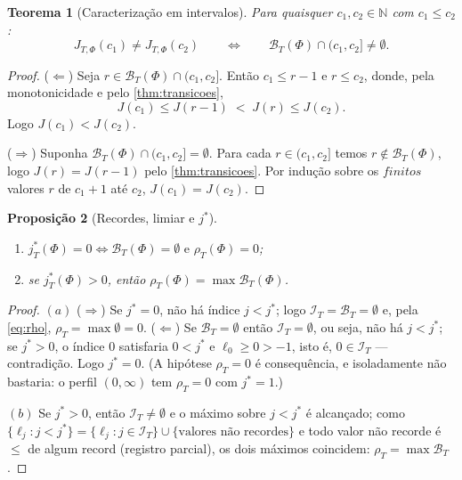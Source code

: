 \documentclass[11pt,a4paper]{article}
\newtheorem{theorem}{Teorema}[section]
\newtheorem{proposition}[theorem]{Proposição}
\theoremstyle{definition}
\theoremstyle{remark}
\newcommand{\N}{\mathbb{N}}
\begin{document}
\begin{theorem}[Caracteriza\c{c}\~{a}o em intervalos]\label{thm:intervalos}
Para quaisquer $c_1, c_2 \in \N$ com $c_1 \leq c_2$:
\begin{equation}\label{eq:63}
  J_{T,\Phi}(c_1) \neq J_{T,\Phi}(c_2)
  \qquad\iff\qquad
  \mathcal{B}_T(\Phi) \cap (c_1, c_2] \neq \emptyset.
\end{equation}
\end{theorem}

\begin{proof}
($\Leftarrow$) Seja $r \in \mathcal{B}_T(\Phi) \cap (c_1, c_2]$. Então
$c_1 \leq r-1$ e $r \leq c_2$, donde, pela monotonicidade e pelo
\cref{thm:transicoes},
\[
  J(c_1) \leq J(r-1) \;<\; J(r) \leq J(c_2).
\]
Logo $J(c_1) < J(c_2)$.

($\Rightarrow$) Suponha $\mathcal{B}_T(\Phi) \cap (c_1, c_2] = \emptyset$.
Para cada $r \in (c_1, c_2]$ temos $r \notin \mathcal{B}_T(\Phi)$, logo
$J(r) = J(r-1)$ pelo \cref{thm:transicoes}. Por indução sobre os
$finitos$ valores $r$ de $c_1+1$ até $c_2$, $J(c_1) = J(c_2)$.
\end{proof}

\begin{proposition}[Recordes, limiar e $j^{*}$]\label{prop:t41}
\begin{enumerate}
  \item[$(a)$] $j^{*}_{T}(\Phi) = 0 \iff \mathcal{B}_T(\Phi) = \emptyset
  \text{ e } \rho_T(\Phi) = 0$;
  \item[$(b)$] se $j^{*}_{T}(\Phi) > 0$, então
  $\rho_T(\Phi) = \max \mathcal{B}_T(\Phi)$.
\end{enumerate}
\end{proposition}

\begin{proof}
$(a)$ ($\Rightarrow$) Se $j^{*} = 0$, não há índice $j < j^{*}$; logo
$\mathcal{I}_T = \mathcal{B}_T = \emptyset$ e, pela \cref{eq:rho},
$\rho_T = \max \emptyset = 0$. ($\Leftarrow$) Se $\mathcal{B}_T = \emptyset$
então $\mathcal{I}_T = \emptyset$, ou seja, não há $j < j^{*}$; se
$j^{*} > 0$, o índice $0$ satisfaria $0 < j^{*}$ e
$\ell_0 \geq 0 > -1$, isto é, $0 \in \mathcal{I}_T$ — contradição. Logo
$j^{*} = 0$. (A hipótese $\rho_T = 0$ é consequência, e isoladamente não
bastaria: o perfil $(0,\infty)$ tem $\rho_T = 0$ com $j^{*} = 1$.)

$(b)$ Se $j^{*} > 0$, então $\mathcal{I}_T \neq \emptyset$ e o máximo sobre
$j < j^{*}$ é alcançado; como $\{ \ell_j : j < j^{*} \} =
\{ \ell_j : j \in \mathcal{I}_T \} \cup \{\text{valores não recordes}\}$ e
todo valor não recorde é $\leq$ de algum record (registro parcial), os dois
máximos coincidem: $\rho_T = \max \mathcal{B}_T$.
\end{proof}
\end{document}
